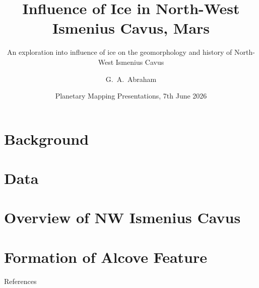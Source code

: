 \documentclass{beamer}
\title[]
{Influence of Ice in North-West Ismenius Cavus, Mars}
\subtitle{An exploration into influence of ice on the geomorphology and history of North-West Ismenius Cavus}
\author[Abraham, George] 
{G.~A.~Abraham\inst{1}}
\institute[INGEO]
{
  \inst{1}%
  Dipartimento di Ingegneria e Geologia, \\ Universit\`a d'Annunzio
}
\date[2026] 
{Planetary Mapping Presentations, 7th June 2026}
\begin{document}
\frame{\titlepage}

\section{Background}




\section{Data}

\section{Overview of NW Ismenius Cavus}
















\section{Formation of Alcove Feature}












\begin{frame}[allowframebreaks]{References} 
\printbibliography
\end{frame}
\frame{\titlepage}
\end{document}
